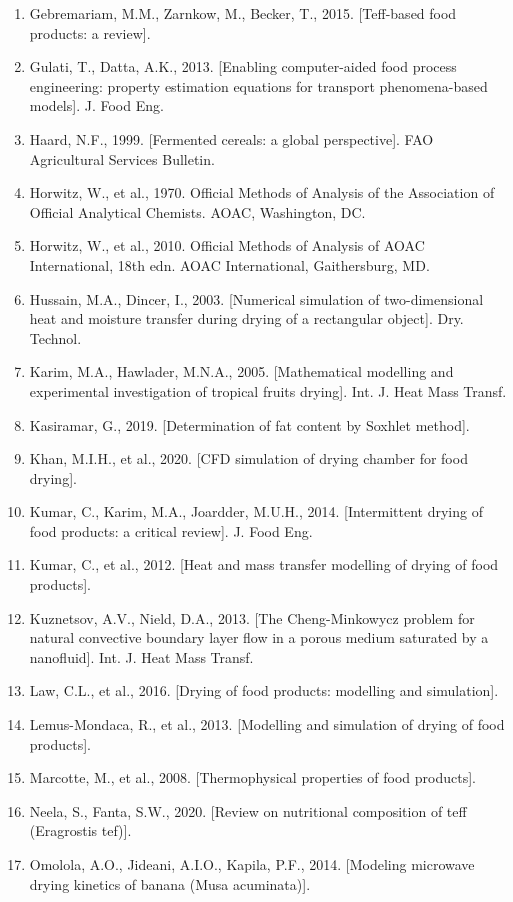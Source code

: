 \documentclass[11pt,a4paper]{ctexart}
\begin{document}
\begin{enumerate}
\item Gebremariam, M.M., Zarnkow, M., Becker, T., 2015. [Teff-based food products: a review].
\item Gulati, T., Datta, A.K., 2013. [Enabling computer-aided food process engineering: property estimation equations for transport phenomena-based models]. J. Food Eng.
\item Haard, N.F., 1999. [Fermented cereals: a global perspective]. FAO Agricultural Services Bulletin.
\item Horwitz, W., et al., 1970. Official Methods of Analysis of the Association of Official Analytical Chemists. AOAC, Washington, DC.
\item Horwitz, W., et al., 2010. Official Methods of Analysis of AOAC International, 18th edn. AOAC International, Gaithersburg, MD.
\item Hussain, M.A., Dincer, I., 2003. [Numerical simulation of two-dimensional heat and moisture transfer during drying of a rectangular object]. Dry. Technol.
\item Karim, M.A., Hawlader, M.N.A., 2005. [Mathematical modelling and experimental investigation of tropical fruits drying]. Int. J. Heat Mass Transf.
\item Kasiramar, G., 2019. [Determination of fat content by Soxhlet method].
\item Khan, M.I.H., et al., 2020. [CFD simulation of drying chamber for food drying].
\item Kumar, C., Karim, M.A., Joardder, M.U.H., 2014. [Intermittent drying of food products: a critical review]. J. Food Eng.
\item Kumar, C., et al., 2012. [Heat and mass transfer modelling of drying of food products].
\item Kuznetsov, A.V., Nield, D.A., 2013. [The Cheng-Minkowycz problem for natural convective boundary layer flow in a porous medium saturated by a nanofluid]. Int. J. Heat Mass Transf.
\item Law, C.L., et al., 2016. [Drying of food products: modelling and simulation].
\item Lemus-Mondaca, R., et al., 2013. [Modelling and simulation of drying of food products].
\item Marcotte, M., et al., 2008. [Thermophysical properties of food products].
\item Neela, S., Fanta, S.W., 2020. [Review on nutritional composition of teff (Eragrostis tef)].
\item Omolola, A.O., Jideani, A.I.O., Kapila, P.F., 2014. [Modeling microwave drying kinetics of banana (Musa acuminata)].

\end{enumerate}
\end{document}
